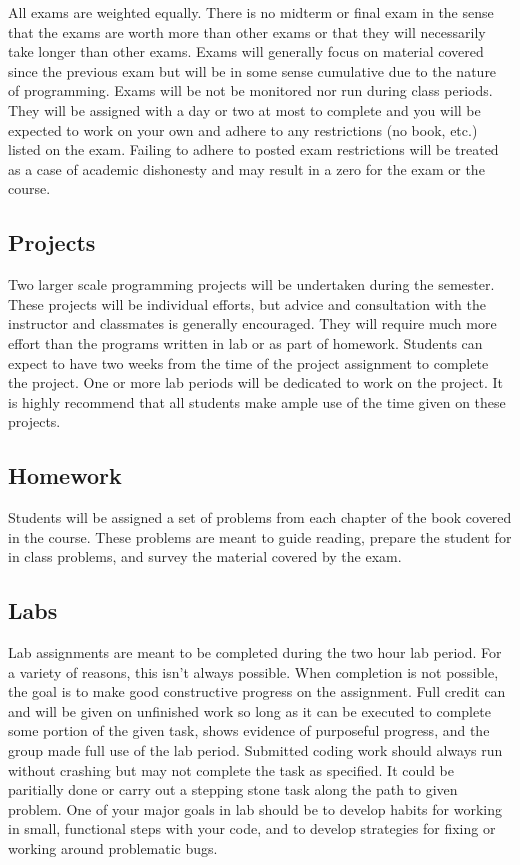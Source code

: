 \documentclass[10pt]{article}
\begin{document}
All exams are weighted equally. There is no midterm or final exam in the sense that the exams are worth more than other exams or that they will necessarily take longer than other exams.  Exams will generally focus on material covered since the previous exam but will be in some sense cumulative due to the nature of programming. Exams will be not be monitored nor run during class periods. They will be assigned with a day or two at most to complete and you will be expected to work on your own and adhere to any restrictions (no book, etc.) listed on the exam. Failing to adhere to posted exam restrictions will be treated as a case of academic dishonesty and may result in a zero for the exam or the course.

\subsection*{Projects}

Two larger scale programming projects will be undertaken during the semester. These projects will be individual efforts, but advice and consultation with the instructor and classmates is generally encouraged. They will require much more effort than the programs written in lab or as part of homework. Students can expect to have two weeks from the time of the project assignment to complete the project. One or more lab periods will be dedicated to work on the project. It is highly recommend that all students make ample use of the time given on these projects.

\subsection*{Homework}

Students will be assigned a set of problems from each chapter of the book covered in the course. These problems are meant to guide reading, prepare the student for in class problems, and survey the material covered by the exam.

\subsection*{Labs}

Lab assignments are meant to be completed during the two hour lab period. For a variety of reasons, this isn't always possible. When completion is not possible, the goal is to make good constructive progress on the assignment. Full credit can and will be given on unfinished work so long as it can be executed to complete some portion of the given task, shows evidence of purposeful progress, and the group made full use of the lab period. Submitted coding work should always run without crashing but may not complete the task as specified. It could be paritially done or carry out a stepping stone task along the path to given problem. One of your major goals in lab should be to develop habits for working in small, functional steps with your code, and to develop strategies for fixing or working around problematic bugs.
\end{document}
